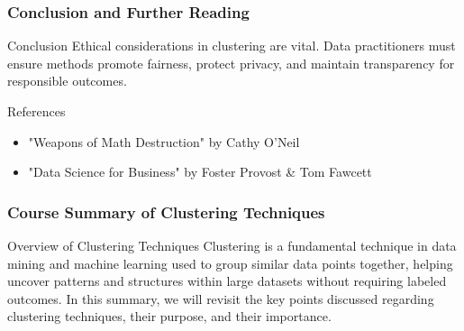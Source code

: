 \documentclass[aspectratio=169]{beamer}
\begin{document}
\begin{frame}[fragile]
    \frametitle{Conclusion and Further Reading}
    \begin{block}{Conclusion}
        Ethical considerations in clustering are vital. Data practitioners must ensure methods promote fairness, protect privacy, and maintain transparency for responsible outcomes.
    \end{block}
    \begin{block}{References}
        \begin{itemize}
            \item "Weapons of Math Destruction" by Cathy O'Neil
            \item "Data Science for Business" by Foster Provost \& Tom Fawcett
        \end{itemize}
    \end{block}
\end{frame}

\begin{frame}[fragile]
    \frametitle{Course Summary of Clustering Techniques}
    \begin{block}{Overview of Clustering Techniques}
        Clustering is a fundamental technique in data mining and machine learning used to group similar data points together, helping uncover patterns and structures within large datasets without requiring labeled outcomes. In this summary, we will revisit the key points discussed regarding clustering techniques, their purpose, and their importance.
    \end{block}
\end{frame}
\end{document}

